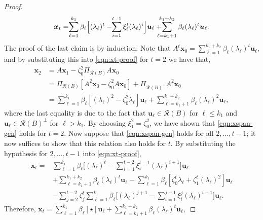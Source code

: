 \documentclass[journal]{IEEEtran}
\theoremstyle{definition}
\theoremstyle{remark}
\newcommand\x{{\bm x}}
\def\u{{\bm u}}
\begin{document}
\begin{proof}
    \begin{gather}    \label{eqn:xspan-gen}
        \x_t = \hspace{-0.1cm} \sum_{\ell=1}^{k_1} \beta_\ell \Big[ (\lambda_\ell)^t  -  \hspace{-0.1cm} \sum_{i=1}^{t-1} \xi^{t}_{i}  (\lambda_\ell)^i   \Big]\u_\ell + \hspace{-0.3cm} \sum_{\ell=k_1+1}^{k_1+k_2} \beta_\ell (\lambda_\ell)^t \u_\ell.
    \end{gather}
    The proof of the last claim is by induction.
    Note that $A^t \x_0 = \sum_{\ell=1}^{k_1+k_2} \beta_\ell (\lambda_\ell)^t \u_\ell$, and by substituting this into \cref{eqn:xt-proof} for $t=2$ we have that,
    \begin{align*}
        \x_2 
        &= A \x_1 -\zeta_0^2 \Pi_{\mathcal{R}(B)} A\x_0 \\
        &=  \Pi_{\mathcal{R}(B)} \left[A^2 \x_0 - \zeta_0^2 A \x_0\right] +  \Pi_{\mathcal{R}(B)^\perp} A^2 \x_0\\
        &= \textstyle  \sum_{\ell=1}^{k_1} \beta_\ell  \left[(\lambda_\ell)^2 - \zeta_0^2 \lambda_\ell \right] \u_\ell +  \sum_{\ell=k_1+1}^{k_1+k_2} \beta_\ell (\lambda_\ell)^2 \u_\ell,
    \end{align*}
    where the last equality is due to the fact that $\u_\ell \in \mathcal{R}(B)$ for $\ell \leq k_1$ and $\u_\ell \in \mathcal{R}(B)^\perp$ for $\ell > k_1$.
    By choosing $\xi_1^2 = \zeta_0^2$, we have shown that \cref{eqn:xspan-gen} holds for $t=2$.
    Now suppose that \cref{eqn:xspan-gen} holds for all $2,\dots, t-1$; it now suffices to show that this relation also holds for $t$. By substituting the hypothesis for $2,\dots, t-1$ into \cref{eqn:xt-proof},
     \begin{align*}
         \x_t 
         =& \textstyle \sum_{\ell=1}^{k_1} \beta_\ell \Big[ (\lambda_\ell)^{t}  -  \sum_{i=1}^{t-2} \xi^{t-1}_{i}  (\lambda_\ell)^{i+1}   \Big]\u_\ell \\
         & \textstyle + \sum_{\ell=k_1+1}^{k_1+k_2} \beta_\ell (\lambda_\ell)^{t} \u_\ell - \sum_{\ell=1}^{k_1} \beta_\ell[ \zeta_0^t \lambda_\ell + \zeta_1^t(\lambda_\ell)^2] \u_\ell \\
         & \textstyle -\sum_{j=2}^{t-2} \zeta_j^t \sum_{\ell=1}^{k_1} \beta_\ell \Big[ (\lambda_\ell)^{j+1}  -  \sum_{i=1}^{j-1} \xi^{j}_{i}  (\lambda_\ell)^{i+1}   \Big]\u_\ell.
     \end{align*}
     Therefore, $\x_t 
         = \textstyle \sum_{\ell=1}^{k_1} \beta_\ell \left[ \star \right]\u_\ell +  \sum_{\ell=k_1+1}^{k_1+k_2} \beta_\ell (\lambda_\ell)^{t} \u_\ell,$

\end{proof}
\end{document}

